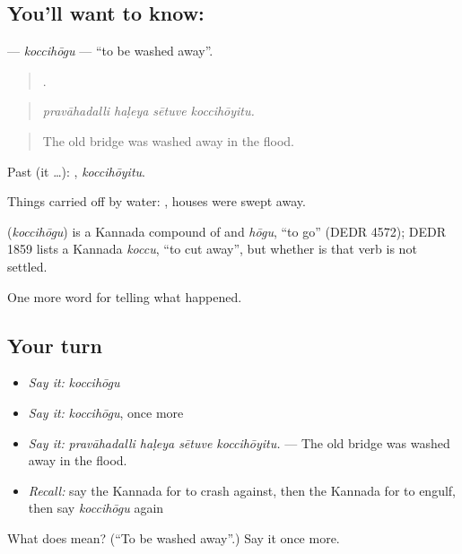 \subsection*{You'll want to know: }
\textbf{} — \emph{koccihōgu} — \textquotedblleft{}to be washed away\textquotedblright{}.

\begin{quote}
   .
\end{quote}

\begin{quote}
\emph{pravāhadalli haḷeya sētuve koccihōyitu.}
\end{quote}

\begin{quote}
The old bridge was washed away in the flood.
\end{quote}

Past (it …): , \emph{koccihōyitu}.

Things carried off by water:  , houses were swept away.

\begin{cousinweb}
\textbf{} (\emph{koccihōgu}) is a Kannada compound of  and \emph{hōgu}, \textquotedblleft{}to go\textquotedblright{} (DEDR 4572); DEDR 1859 lists a Kannada \emph{koccu}, \textquotedblleft{}to cut away\textquotedblright{}, but whether  is that verb is not settled.
\end{cousinweb}

\begin{grammarlens}[title={What you've built}]
One more word for telling what happened.
\end{grammarlens}

\subsection*{Your turn}
\begin{itemize}
\raggedright
  \item \emph{Say it:} \emph{koccihōgu}
  \item \emph{Say it:} \emph{koccihōgu}, once more
  \item \emph{Say it:} \emph{pravāhadalli haḷeya sētuve koccihōyitu.} — The old bridge was washed away in the flood.
  \item \emph{Recall:} say the Kannada for to crash against, then the Kannada for to engulf, then say \emph{koccihōgu} again
\end{itemize}

\begin{tcolorbox}[breakable,colback=teal!4,colframe=teal!35!black,title={Before you move on}]
What does  mean? (\textquotedblleft{}To be washed away\textquotedblright{}.) Say it once more.
\end{tcolorbox}
